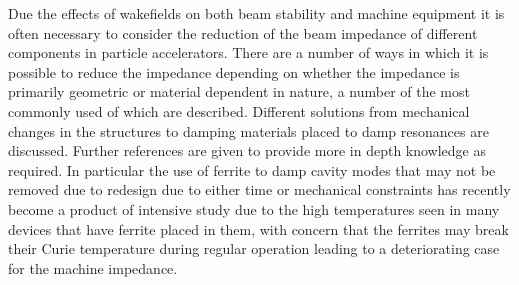 Due the effects of wakefields on both beam stability and machine equipment it is often necessary to consider the reduction of the beam impedance of different components in particle accelerators. There are a number of ways in which it is possible to reduce the impedance depending on whether the impedance is primarily geometric or material dependent in nature, a number of the most commonly used of which are described. Different solutions from mechanical changes in the structures to damping materials placed to damp resonances are discussed. Further references are given to provide more in depth knowledge as required. In particular the use of ferrite to damp cavity modes that may not be removed due to redesign due to either time or mechanical constraints has recently become a product of intensive study due to the high temperatures seen in many devices that have ferrite placed in them, with concern that the ferrites may break their Curie temperature during regular operation leading to a deteriorating case for the machine impedance. 